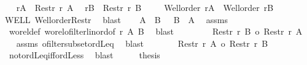 \begin{isabellebody}
%
\isatagproof
{}\isamarkupfalse%
{\isacharminus}{\kern0pt}\isanewline
\ \ \isamarkupfalse%
\ {\isacharquery}{\kern0pt}rA\ {\isacharequal}{\kern0pt}\ {\isachardoublequoteopen}Restr\ r\ A{\isachardoublequoteclose}\ \isamarkupfalse%
\ {\isacharquery}{\kern0pt}rB\ {\isacharequal}{\kern0pt}\ {\isachardoublequoteopen}Restr\ r\ B{\isachardoublequoteclose}\isanewline
\ \ \isamarkupfalse%
\ {}{\isacharcolon}{\kern0pt}\ {\isachardoublequoteopen}Well{\isacharunderscore}{\kern0pt}order\ {\isacharquery}{\kern0pt}rA\ {\isasymand}\ Well{\isacharunderscore}{\kern0pt}order\ {\isacharquery}{\kern0pt}rB{\isachardoublequoteclose}\isanewline
\ \ \isamarkupfalse%
\ WELL\ Well{\isacharunderscore}{\kern0pt}order{\isacharunderscore}{\kern0pt}Restr\ \isamarkupfalse%
\ blast\isanewline
\ \ \isamarkupfalse%
\ {\isachardoublequoteopen}{\isacharparenleft}{\kern0pt}A\ {\isacharless}{\kern0pt}\ B{\isacharparenright}{\kern0pt}\ {\isacharequal}{\kern0pt}\ {\isacharparenleft}{\kern0pt}{\isasymnot}\ B\ {\isasymle}\ A{\isacharparenright}{\kern0pt}{\isachardoublequoteclose}\ \isamarkupfalse%
\ assms\isanewline
\ \ wo{\isacharunderscore}{\kern0pt}rel{\isacharunderscore}{\kern0pt}def\ wo{\isacharunderscore}{\kern0pt}rel{\isachardot}{\kern0pt}ofilter{\isacharunderscore}{\kern0pt}linord{\isacharbrackleft}{\kern0pt}of\ r\ A\ B{\isacharbrackright}{\kern0pt}\ \isamarkupfalse%
\ blast\isanewline
\ \ \isamarkupfalse%
\ \isamarkupfalse%
\ {\isachardoublequoteopen}{\isasymdots}\ {\isacharequal}{\kern0pt}\ {\isacharparenleft}{\kern0pt}{\isasymnot}\ Restr\ r\ B\ {\isasymle}o\ Restr\ r\ A{\isacharparenright}{\kern0pt}{\isachardoublequoteclose}\isanewline
\ \ \isamarkupfalse%
\ assms\ ofilter{\isacharunderscore}{\kern0pt}subset{\isacharunderscore}{\kern0pt}ordLeq\ \isamarkupfalse%
\ blast\isanewline
\ \ \isamarkupfalse%
\ \isamarkupfalse%
\ {\isachardoublequoteopen}{\isasymdots}\ {\isacharequal}{\kern0pt}\ {\isacharparenleft}{\kern0pt}Restr\ r\ A\ {\isacharless}{\kern0pt}o\ Restr\ r\ B{\isacharparenright}{\kern0pt}{\isachardoublequoteclose}\isanewline
\ \ \isamarkupfalse%
\ {}\ not{\isacharunderscore}{\kern0pt}ordLeq{\isacharunderscore}{\kern0pt}iff{\isacharunderscore}{\kern0pt}ordLess\ \isamarkupfalse%
\ blast\isanewline
\ \ \isamarkupfalse%
\ \isamarkupfalse%
\ {\isacharquery}{\kern0pt}thesis\ \isacommand{{\isachardot}{\kern0pt}}\isamarkupfalse%

\end{isabellebody}
